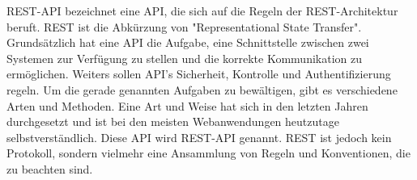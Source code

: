 
REST-API bezeichnet eine API, die sich auf die Regeln der REST-Architektur beruft. REST ist die Abkürzung von "Representational State Transfer". Grundsätzlich hat eine API die Aufgabe, eine Schnittstelle zwischen zwei Systemen zur Verfügung zu stellen und die korrekte Kommunikation zu ermöglichen. Weiters sollen API's Sicherheit, Kontrolle und Authentifizierung regeln. Um die gerade genannten Aufgaben zu bewältigen, gibt es verschiedene Arten und Methoden. Eine Art und Weise hat sich in den letzten Jahren durchgesetzt und ist bei den meisten Webanwendungen heutzutage selbstverständlich. Diese API wird REST-API genannt. REST ist jedoch kein Protokoll, sondern vielmehr eine Ansammlung von Regeln und Konventionen, die zu beachten sind. \cite{WikiREST}

